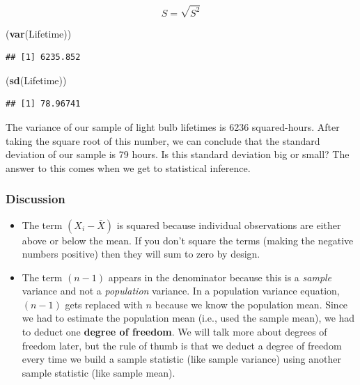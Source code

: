 \documentclass[
]{book}
\newenvironment{Shaded}{\begin{snugshade}}{\end{snugshade}}
\newcommand{\FunctionTok}[1]{\textcolor[rgb]{0.13,0.29,0.53}{\textbf{#1}}}
\newcommand{\NormalTok}[1]{#1}
\begin{document}
\[S=\sqrt{S^2}\]

\begin{Shaded}
\begin{Highlighting}[]
\NormalTok{(}\FunctionTok{var}\NormalTok{(Lifetime))}
\end{Highlighting}
\end{Shaded}

\begin{verbatim}
## [1] 6235.852
\end{verbatim}

\begin{Shaded}
\begin{Highlighting}[]
\NormalTok{(}\FunctionTok{sd}\NormalTok{(Lifetime))}
\end{Highlighting}
\end{Shaded}

\begin{verbatim}
## [1] 78.96741
\end{verbatim}

The variance of our sample of light bulb lifetimes is 6236 squared-hours. After taking the square root of this number, we can conclude that the standard deviation of our sample is 79 hours. Is this standard deviation big or small? The answer to this comes when we get to statistical inference.

\subsubsection*{Discussion}\label{discussion}

\begin{itemize}
\item
  The term \((X_i-\bar{X})\) is squared because individual observations are either above or below the mean. If you don't square the terms (making the negative numbers positive) then they will sum to zero by design.
\item
  The term \((n-1)\) appears in the denominator because this is a \emph{sample} variance and not a \emph{population} variance. In a population variance equation, \((n-1)\) gets replaced with \(n\) because we know the population mean. Since we had to estimate the population mean (i.e., used the sample mean), we had to deduct one \textbf{degree of freedom}. We will talk more about degrees of freedom later, but the rule of thumb is that we deduct a degree of freedom every time we build a sample statistic (like sample variance) using another sample statistic (like sample mean).
\end{itemize}
\end{document}
